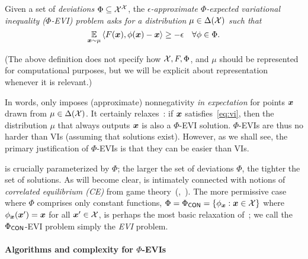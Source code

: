 \begin{definition}\label{def:evi}
    Given a set of {\em deviations} $\Phi \subseteq {\mathcal{X}}^{\mathcal{X}}$, the \em{$\epsilon$-approximate $\Phi$-expected variational inequality ($\Phi$-EVI)} problem asks for a distribution $\mu \in \Delta({\mathcal{X}})$ such that
    \begin{equation}\label{eq:evi}
        \E_{\vx\sim\mu} \ip{F(\vx), \phi(\vx) - \vx} \ge - \epsilon \quad \forall \phi \in \Phi.
    \end{equation}
\end{definition}
%

(The above definition does not specify how ${\mathcal{X}}, F, \Phi$, and $\mu$ should be represented for computational purposes, but we will be explicit about representation whenever it is relevant.)

In words,  only imposes (approximate) nonnegativity \emph{in expectation} for points ${\bm{x}}$ drawn from $\mu \in \Delta({\mathcal{X}})$. It certainly relaxes~: if ${\bm{x}}$ satisfies~\eqref{eq:vi}, then the distribution $\mu$ that always outputs ${\bm{x}}$ is also a $\Phi$-EVI solution. $\Phi$-EVIs are thus no harder than VIs (assuming that solutions exist). However, as we shall see, the primary justification of $\Phi$-EVIs is that they can be easier than VIs.

  is crucially parameterized by $\Phi$; the larger the set of deviations $\Phi$, the tighter the set of solutions. As will become clear,  is intimately connected with notions of \emph{correlated equilibrium (CE)} from game theory~(\eg,~\citealp{Aumann74:Subjectivity}). The more permissive case where $\Phi$ comprises only constant functions, $\Phi = \Phi_\mathsf{CON} = \{ \phi_{\bm{x}} : {\bm{x}} \in {\mathcal{X}} \}$ where $\phi_{\bm{x}}({\bm{x}}') = {\bm{x}}$ for all ${\bm{x}}' \in {\mathcal{X}}$, is perhaps the most basic relaxation of~; we call the $\Phi_\mathsf{CON}$-EVI problem simply the {\em EVI} problem.

\paragraph{Algorithms and complexity for $\Phi$-EVIs}

